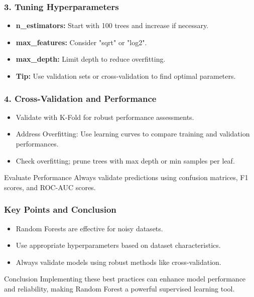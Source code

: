 \documentclass[aspectratio=169]{beamer}
\begin{document}
\begin{frame}
    \frametitle{3. Tuning Hyperparameters}
    \begin{itemize}
        \item \textbf{n\_estimators:} Start with 100 trees and increase if necessary.
        \item \textbf{max\_features:} Consider "sqrt" or "log2".
        \item \textbf{max\_depth:} Limit depth to reduce overfitting.
        \item \textbf{Tip:} Use validation sets or cross-validation to find optimal parameters.
    \end{itemize}

    \frametitle{4. Cross-Validation and Performance}
    \begin{itemize}
        \item Validate with K-Fold for robust performance assessments.
        \item Address Overfitting: Use learning curves to compare training and validation performances.
        \item Check overfitting; prune trees with max depth or min samples per leaf.
    \end{itemize}

    \begin{block}{Evaluate Performance}
        Always validate predictions using confusion matrices, F1 scores, and ROC-AUC scores.
    \end{block}
\end{frame}

\begin{frame}
    \frametitle{Key Points and Conclusion}
    \begin{itemize}
        \item Random Forests are effective for noisy datasets.
        \item Use appropriate hyperparameters based on dataset characteristics.
        \item Always validate models using robust methods like cross-validation.
    \end{itemize}
    
    \begin{block}{Conclusion}
        Implementing these best practices can enhance model performance and reliability, making Random Forest a powerful supervised learning tool.
    \end{block}
\end{frame}
\end{document}
